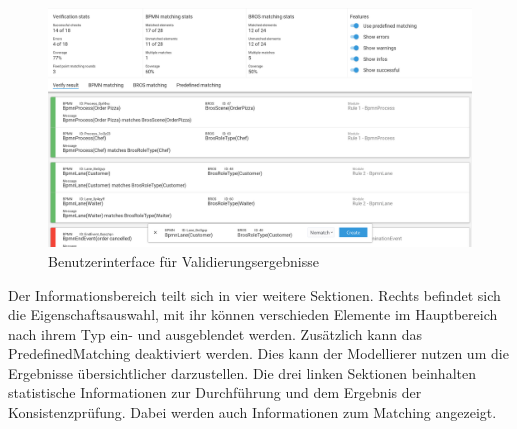 \begin{figure}
    \centering
    \includegraphics[width=\textwidth,keepaspectratio]{../images/Screenshot-Result.png}%
    \caption{Benutzerinterface für Validierungsergebnisse}%
    \label{fig:screenshot-result}
\end{figure}

Der Informationsbereich teilt sich in vier weitere Sektionen.
Rechts befindet sich die Eigenschaftsauswahl, mit ihr können verschieden Elemente im Hauptbereich nach ihrem Typ ein- und ausgeblendet werden.
Zusätzlich kann das PredefinedMatching deaktiviert werden.
Dies kann der Modellierer nutzen um die Ergebnisse übersichtlicher darzustellen.
Die drei linken Sektionen beinhalten statistische Informationen zur Durchführung und dem Ergebnis der Konsistenzprüfung.
Dabei werden auch Informationen zum Matching angezeigt.

